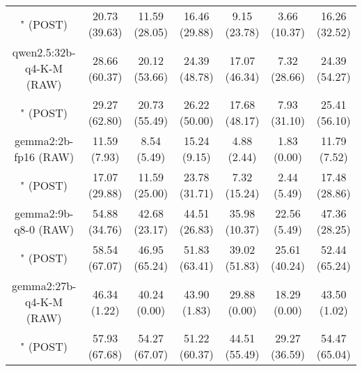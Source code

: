 \begin{table}[]
{\begin{tabular}{ccccccc}
        

        \multicolumn{1}{c|}{" (POST)} & 20.73 (39.63) & 11.59 (28.05) & \multicolumn{1}{c|}{16.46 (29.88)} & 9.15 (23.78) & \multicolumn{1}{c|}{3.66 (10.37)} & 16.26 (32.52) \\
        \cline{1-7}
        

        \multicolumn{1}{c|}{qwen2.5:32b-q4-K-M (RAW)} & 28.66 (60.37) & 20.12 (53.66) & \multicolumn{1}{c|}{24.39 (48.78)} & 17.07 (46.34) & \multicolumn{1}{c|}{7.32 (28.66)} & 24.39 (54.27) \\
        
        

        \multicolumn{1}{c|}{" (POST)} & 29.27 (62.80) & 20.73 (55.49) & \multicolumn{1}{c|}{26.22 (50.00)} & 17.68 (48.17) & \multicolumn{1}{c|}{7.93 (31.10)} & 25.41 (56.10) \\
        \cline{1-7}
        

        \multicolumn{1}{c|}{gemma2:2b-fp16 (RAW)} & 11.59 (7.93) & 8.54 (5.49) & \multicolumn{1}{c|}{15.24 (9.15)} & 4.88 (2.44) & \multicolumn{1}{c|}{1.83 (0.00)} & 11.79 (7.52) \\
        
        

        \multicolumn{1}{c|}{" (POST)} & 17.07 (29.88) & 11.59 (25.00) & \multicolumn{1}{c|}{23.78 (31.71)} & 7.32 (15.24) & \multicolumn{1}{c|}{2.44 (5.49)} & 17.48 (28.86) \\
        \cline{1-7}
        

        \multicolumn{1}{c|}{gemma2:9b-q8-0 (RAW)} & 54.88 (34.76) & 42.68 (23.17) & \multicolumn{1}{c|}{44.51 (26.83)} & 35.98 (10.37) & \multicolumn{1}{c|}{22.56 (5.49)} & 47.36 (28.25) \\
        
        

        \multicolumn{1}{c|}{" (POST)} & 58.54 (67.07) & 46.95 (65.24) & \multicolumn{1}{c|}{51.83 (63.41)} & 39.02 (51.83) & \multicolumn{1}{c|}{25.61 (40.24)} & 52.44 (65.24) \\
        \cline{1-7}
        

        \multicolumn{1}{c|}{gemma2:27b-q4-K-M (RAW)} & 46.34 (1.22) & 40.24 (0.00) & \multicolumn{1}{c|}{43.90 (1.83)} & 29.88 (0.00) & \multicolumn{1}{c|}{18.29 (0.00)} & 43.50 (1.02) \\
        
        

        \multicolumn{1}{c|}{" (POST)} & 57.93 (67.68) & 54.27 (67.07) & \multicolumn{1}{c|}{51.22 (60.37)} & 44.51 (55.49) & \multicolumn{1}{c|}{29.27 (36.59)} & 54.47 (65.04) \\
        \cline{1-7}
        


\end{tabular}}
\end{table}
